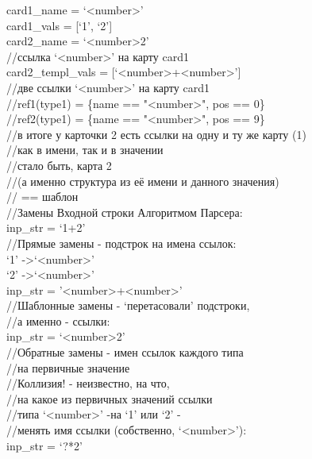 \documentclass{book}
\newcommand{\less}{\textless}
\newcommand{\more}{\textgreater}
\begin{document}
\begin{tcolorbox}[breakable]
card1\_name = `\less number\more' \\
card1\_vals = [`1', `2'] \\

card2\_name = `\less number\more*2' \\
//ссылка `\less number\more' на карту card1 \\

card2\_templ\_vals = [`\less number\more+\less number\more'] \\ 
//две ссылки `\less number\more' на карту card1 \\
//ref1(type1) = \{name == "\less number\more", pos == 0\} \\
//ref2(type1) = \{name == "\less number\more", pos == 9\} \\

//в итоге у карточки 2 есть ссылки на одну и ту же карту (1) \\
//как в имени, так и в значении \\
//стало быть, карта 2 \\
//(а именно структура из её имени и данного значения) \\
// == шаблон \\

//Замены Входной строки Алгоритмом Парсера: \\
inp\_str = `1+2' \\

//Прямые замены - подстрок на имена ссылок: \\
`1' -\more `\less number\more' \\
`2' -\more `\less number\more' \\
inp\_str = '\less number\more+\less number\more' \\

//Шаблонные замены - `перетасовали' подстроки, \\
//а именно - ссылки: \\
inp\_str = `\less number\more*2' \\

//Обратные замены - имен ссылок каждого типа \\
//на первичные значение \\
//Коллизия! - неизвестно, на что, \\
//на какое из первичных значений ссылки \\
//типа `\less number\more' -на `1' или `2' - \\
//менять имя ссылки (собственно, `\less number\more'): \\
inp\_str = `?*2'
\end{tcolorbox}
\end{document}
